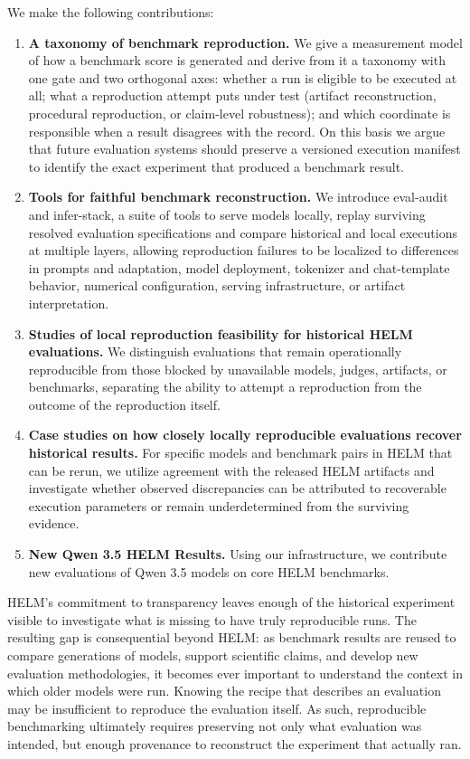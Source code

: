 We make the following contributions:
\begin{enumerate}[nosep,leftmargin=1.4em]
\item \textbf{A taxonomy of benchmark reproduction.} We give a measurement model of how a benchmark score is generated and derive from it a taxonomy with one gate and two orthogonal axes: whether a run is eligible to be executed at all; what a reproduction attempt puts under test (artifact reconstruction, procedural reproduction, or claim-level robustness); and which coordinate is responsible when a result disagrees with the record. On this basis we argue that future evaluation systems should preserve a versioned execution manifest to identify the exact experiment that produced a benchmark result.

\item \textbf{Tools for faithful benchmark reconstruction.} We introduce eval-audit and infer-stack, a suite of tools to serve models locally, replay surviving resolved evaluation specifications and compare historical and local executions at multiple layers, allowing reproduction failures to be localized to differences in prompts and adaptation, model deployment, tokenizer and chat-template behavior, numerical configuration, serving infrastructure, or artifact interpretation.

\item \textbf{Studies of local reproduction feasibility for historical HELM evaluations.} We distinguish evaluations that remain operationally reproducible from those blocked by unavailable models, judges, artifacts, or benchmarks, separating the ability to attempt a reproduction from the outcome of the reproduction itself.

\item \textbf{Case studies on how closely locally reproducible evaluations recover historical results.} For specific models and benchmark pairs in HELM that can be rerun, we utilize agreement with the released HELM artifacts and investigate whether observed discrepancies can be attributed to recoverable execution parameters or remain underdetermined from the surviving evidence.

\item \textbf{New Qwen 3.5 HELM Results.} Using our infrastructure, we contribute new evaluations of Qwen 3.5 models on core HELM benchmarks.

\end{enumerate}


HELM's commitment to transparency leaves enough of the historical experiment visible to investigate what is missing to have truly reproducible runs. The resulting gap is consequential beyond HELM: as benchmark results are reused to compare generations of models, support scientific claims, and develop new evaluation methodologies, it becomes ever important to understand the context in which older models were run. Knowing the recipe that describes an evaluation may be insufficient to reproduce the evaluation itself. As such, reproducible benchmarking ultimately requires preserving not only what evaluation was intended, but enough provenance to reconstruct the experiment that actually ran.